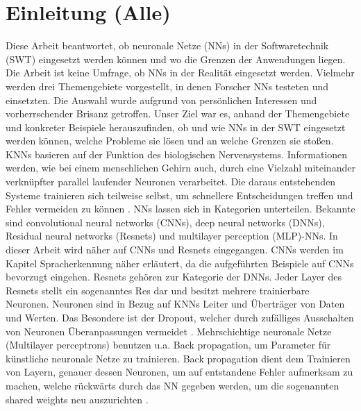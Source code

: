 \section{Einleitung (Alle)}
Diese Arbeit beantwortet, ob neuronale Netze (NNs) in der Softwaretechnik (SWT) eingesetzt werden können und wo die Grenzen der Anwendungen liegen. Die Arbeit ist keine Umfrage, ob NNs in der Realität eingesetzt werden. Vielmehr werden drei Themengebiete vorgestellt, in denen Forscher NNs testeten und einsetzten. Die Auswahl wurde aufgrund von persönlichen Interessen und vorherrschender Brisanz getroffen. Unser Ziel war es, anhand der Themengebiete und konkreter Beispiele herauszufinden, ob und wie NNs in der SWT eingesetzt werden können, welche Probleme sie lösen und an welche Grenzen sie stoßen.
KNNs basieren auf der Funktion des biologischen Nervensystems. Informationen werden, wie bei einem menschlichen Gehirn auch, durch eine Vielzahl miteinander verknüpfter parallel laufender Neuronen  verarbeitet. Die daraus entstehenden Systeme trainieren sich teilweise selbst, um schnellere Entscheidungen treffen und Fehler vermeiden zu können \cite{technology}. 
NNs lassen sich in Kategorien unterteilen. Bekannte sind convolutional neural networks (CNNs), deep neural networks (DNNs), Residual neural networks (Resnets) und multilayer perception (MLP)-NNs. In dieser Arbeit wird näher auf CNNs und Resnets eingegangen. CNNs werden im Kapitel Spracherkennung näher erläutert, da die aufgeführten Beispiele auf CNNs bevorzugt eingehen. Resnets gehören zur Kategorie der DNNs. Jeder Layer des Resnets stellt ein sogenanntes Res dar und besitzt mehrere trainierbare Neuronen. Neuronen sind in Bezug auf KNNs Leiter und Überträger von Daten und Werten. Das Besondere ist der Dropout, welcher durch zufälliges Ausschalten von Neuronen Überanpassungen vermeidet \cite{residualnn}. Mehrschichtige neuronale Netze (Multilayer perceptrons) benutzen u.a. Back propagation, um Parameter für künstliche neuronale Netze zu trainieren. Back propagation dient dem Trainieren von Layern, genauer dessen Neuronen, um auf entstandene Fehler aufmerksam zu machen, welche rückwärts durch das NN gegeben werden, um die sogenannten shared weights neu auszurichten \cite{usingcnn}.\\


